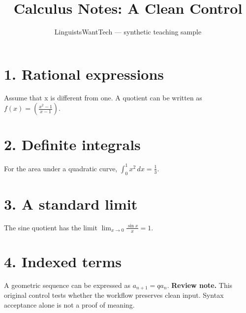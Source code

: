 \documentclass[12pt]{article}
\title{Calculus Notes: A Clean Control}
\author{LinguistsWantTech --- synthetic teaching sample}
\date{}
\begin{document}
\maketitle
\section*{1. Rational expressions}
Assume that x is different from one. A quotient can be written as
$\displaystyle f(x)=\left(\frac{x^2-1}{x-1}\right)$.
\section*{2. Definite integrals}
For the area under a quadratic curve,
$\displaystyle \int_{0}^{1} x^2\,dx=\frac{1}{3}$.
\section*{3. A standard limit}
The sine quotient has the limit
$\displaystyle \lim_{x\to 0}\frac{\sin x}{x}=1$.
\section*{4. Indexed terms}
A geometric sequence can be expressed as $a_{n+1}=q a_n$.
\medskip
\textbf{Review note.} This original control tests whether the workflow
preserves clean input. Syntax acceptance alone is not a proof of meaning.
\end{document}
